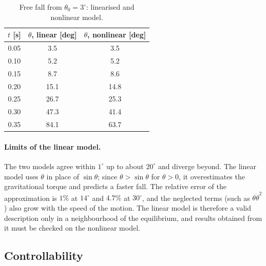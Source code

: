 \begin{table}[h]
\centering
\caption{Free fall from $\theta_0 = 3^\circ$: linearised and nonlinear model.}
\label{tab:lin-vs-nl}
\begin{tabular}{@{}ccc@{}}
\toprule
$t$ [s] & $\theta$, linear [deg] & $\theta$, nonlinear [deg] \\
\midrule
0.05 & 3.5  & 3.5  \\
0.10 & 5.2  & 5.2  \\
0.15 & 8.7  & 8.6  \\
0.20 & 15.1 & 14.8 \\
0.25 & 26.7 & 25.3 \\
0.30 & 47.3 & 41.4 \\
0.35 & 84.1 & 63.7 \\
\bottomrule
\end{tabular}
\end{table}

\paragraph{Limits of the linear model.} The two models agree within
$1^\circ$ up to about $20^\circ$ and diverge beyond. The linear model uses
$\theta$ in place of $\sin\theta$; since $\theta > \sin\theta$ for
$\theta > 0$, it overestimates the gravitational torque and predicts a faster
fall. The relative error of the approximation is $1\%$ at $14^\circ$ and
$4.7\%$ at $30^\circ$, and the neglected terms (such as
$\theta\dot\theta^2$) also grow with the speed of the motion. The linear model
is therefore a valid description only in a neighbourhood of the equilibrium,
and results obtained from it must be checked on the nonlinear model.

\subsection{Controllability}

